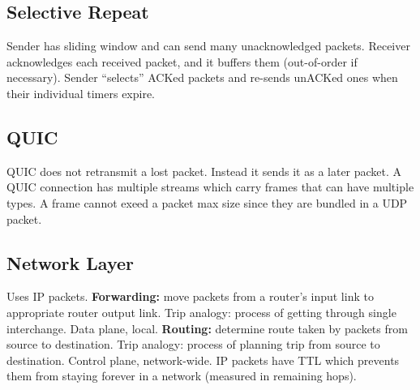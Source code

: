 \subsection{Selective Repeat}
Sender has sliding window and can send many unacknowledged packets.
Receiver acknowledges each received packet, and it buffers them
(out-of-order if necessary). Sender ``selects'' ACKed packets and
re-sends unACKed ones when their individual timers expire.
\subsection{QUIC}
QUIC does not retransmit a lost packet. Instead it sends it as a later
packet. A QUIC connection has multiple streams which carry frames that
can have multiple types. A frame cannot exeed a packet max size since
they are bundled in a UDP packet.
\subsection{Network Layer}
Uses IP packets. \textbf{Forwarding:} move packets from a router's input
link to appropriate router output link. Trip analogy: process of getting
through single interchange. Data plane, local. \textbf{Routing:}
determine route taken by packets from source to destination. Trip
analogy: process of planning trip from source to destination. Control
plane, network-wide. IP packets have TTL which prevents them from
staying forever in a network (measured in remaining hops).
